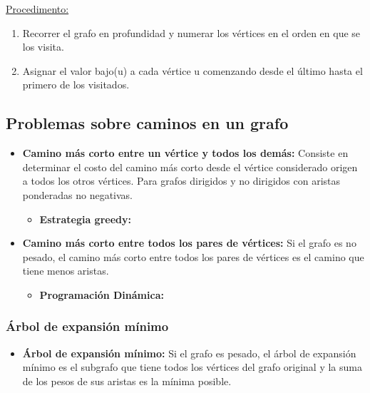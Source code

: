 \documentclass[../main.tex]{subfiles}
\begin{document}
                \underline{Procedimento:}
                \begin{enumerate}
                    \item Recorrer el grafo en profundidad y numerar los vértices en el orden en que se los visita.
                    \item Asignar el valor bajo(u) a cada vértice u comenzando desde el último hasta el primero de los visitados.
                \end{enumerate}

        \subsection{Problemas sobre caminos en un grafo}
                \begin{itemize}
                    \item \textbf{Camino más corto entre un vértice y todos los demás:} Consiste en determinar el costo del camino más corto desde el vértice considerado origen a todos los otros vértices. Para grafos dirigidos y no dirigidos con aristas ponderadas no negativas.
                        \begin{itemize}
                            \item \textbf{Estrategia greedy:} 
                        \end{itemize}
                    \item \textbf{Camino más corto entre todos los pares de vértices:} Si el grafo es no pesado, el camino más corto entre todos los pares de vértices es el camino que tiene menos aristas.
                        \begin{itemize}
                            \item \textbf{Programación Dinámica:} 
                        \end{itemize}
                \end{itemize}

            \subsubsection{Árbol de expansión mínimo}
                \begin{itemize}
                    \item \textbf{Árbol de expansión mínimo:} Si el grafo es pesado, el árbol de expansión mínimo es el subgrafo que tiene todos los vértices del grafo original y la suma de los pesos de sus aristas es la mínima posible.
                \end{itemize}
\end{document}
